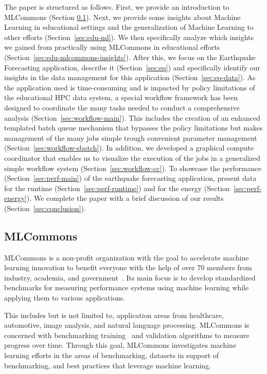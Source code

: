 \documentclass[utf8]{FrontiersinVancouver} %
\begin{document}
The paper is structured as follows. First, we provide an introduction to MLCommons (Section \ref{sec:mlcommons}).  Next, we provide some insights about Machine Learning in educational settings and the generalization of Machine Learning to other efforts (Section~\ref{sec:edu-ml}). We then specifically analyze which insights we gained from practically using MLCommons in educational efforts (Section~\ref{sec:edu-mlcommons-insights}). After this, we focus on the Earthquake Forecasting application, describe it (Section~\ref{sec:eq}) and specifically identify our insights in the data management for this application (Section~\ref{sec:eq-data}).  As the application used is time-consuming and is impacted by policy limitations of the educational HPC data system, a special workflow framework has been designed to coordinate the many tasks needed to conduct a comprehensive analysis (Section~\ref{sec:workflow-main}). This includes the creation of an enhanced templated batch queue mechanism that bypasses the policy limitations but makes management of the many jobs simple trough convenient parameter management (Section~\ref{sec:workflow-sbatch}). In addition, we developed a graphical compute coordinator that enables us to visualize the execution of the jobs in a generalized simple workflow system (Section~\ref{sec:workflow-cc}).  To showcase the performance (Section~\ref{sec:perf-main}) of the earthquake forecasting application, present data for the runtime (Section~\ref{sec:perf-runtime}) and for the energy (Section~\ref{sec:perf-energy}). We complete the paper with a brief discussion of our results (Section~\ref{sec:conclusion}).


\subsection{MLCommons}
\label{sec:mlcommons}

MLCommons is a non-profit organization with the goal to accelerate machine learning innovation to benefit everyone with the help of over 70 members from industry, academia, and government~\citep{www-mlcommons}.  Its main focus is to develop standardized benchmarks for measuring performance systems using machine learning while applying them to various applications.

This includes but is not limited to, application areas from healthcare, automotive, image analysis, and natural language processing. MLCommons is concerned with benchmarking training~\citep{mlperf-training} and validation algorithms to measure progress over time. Through this goal, MLCommons investigates machine learning efforts in the areas of benchmarking, datasets in support of benchmarking, and best practices that leverage machine learning.
\end{document}
